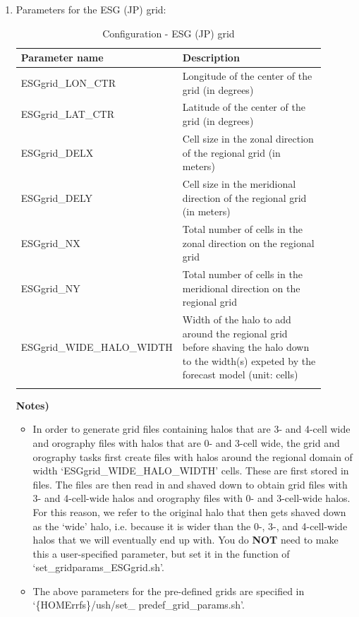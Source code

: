 \documentclass[11pt,fleqn]{report}              %
\begin{document}
\begin{enumerate}
\item Parameters for the ESG (JP) grid:
{
\scriptsize
\begin{longtable}{p{0.27\linewidth} | p{0.63\linewidth} }
\hline
\hline
Parameter name & Description \\
\hline
ESGgrid\_LON\_CTR & Longitude of the center of the grid (in degrees) \\
ESGgrid\_LAT\_CTR & Latitude of the center of the grid (in degrees) \\
ESGgrid\_DELX & Cell size in the zonal direction of the regional grid (in meters) \\
ESGgrid\_DELY & Cell size in the meridional direction of the regional grid (in meters) \\
ESGgrid\_NX & Total number of cells in the zonal direction on the regional grid \\
ESGgrid\_NY & Total number of cells in the meridional direction on the regional grid \\
ESGgrid\_WIDE\_HALO\_WIDTH & Width of the halo to add around the regional grid before shaving the halo down to the width(s) expeted by the forecast model (unit: cells) \\
\hline
\caption{Configuration - ESG (JP) grid}
\label{table:config_JPgrid}
\end{longtable}
}
{\bf Notes)} 
\begin{itemize}
\item In order to generate grid files containing halos that are 3- and 4-cell wide and orography files with halos that are 0- and 3-cell wide, the grid and orography tasks first create files with halos around the regional domain of width `ESGgrid\_WIDE\_HALO\_WIDTH' cells. These are first stored  in files. The files are then read in and shaved down to obtain grid files with 3- and 4-cell-wide halos and orography files with 0- and 3-cell-wide halos. For this reason, we refer to the original halo that then gets shaved down as the `wide'  halo, i.e. because it is wider than the 0-, 3-, and 4-cell-wide halos that we will eventually end up with. You do {\bf NOT} need to make this a user-specified parameter, but set it in the function of `set\_gridparams\_ESGgrid.sh'.
\item The above parameters for the pre-defined grids are specified in `\{HOMErrfs\}/ush/set\_ predef\_grid\_params.sh'.
\end{itemize}

\vspace{0.2cm}


\end{enumerate}
\end{document}
